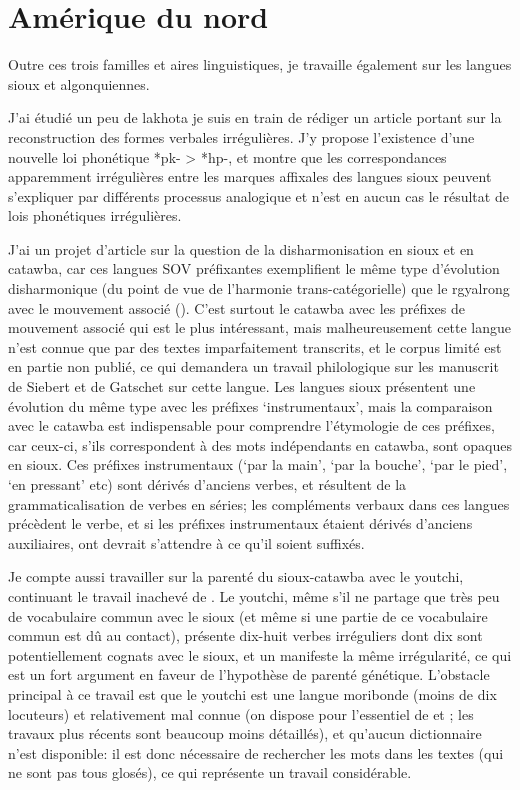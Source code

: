 \documentclass[oldfontcommands,oneside,a4paper,11pt]{memoir}
\begin{document}
\section{Amérique du nord}
Outre ces trois familles et aires linguistiques, je travaille également sur les langues sioux et algonquiennes. 

J'ai étudié un peu de lakhota je suis en train de rédiger un article portant sur la reconstruction des formes verbales irrégulières. J'y propose l'existence d'une nouvelle loi phonétique *pk- > *hp-, et montre que les correspondances apparemment irrégulières entre les marques affixales des langues sioux peuvent s'expliquer par différents processus analogique et n'est en aucun cas le résultat de lois phonétiques irrégulières.  

J'ai un projet d'article sur la question de la disharmonisation en sioux et en catawba, car ces langues SOV préfixantes exemplifient le même type d'évolution disharmonique (du point de vue de l'harmonie trans-catégorielle) que le rgyalrong avec le mouvement associé (\citealt{jacques13harmonization}). C'est surtout le catawba avec les préfixes de mouvement associé qui est le plus intéressant, mais malheureusement cette langue n'est connue que par des textes imparfaitement transcrits, et le corpus limité est en partie non publié, ce qui demandera un travail philologique sur les manuscrit de Siebert et de Gatschet sur cette langue. Les langues sioux présentent une évolution du même type avec les préfixes `instrumentaux', mais la comparaison avec le catawba est indispensable pour comprendre l'étymologie de ces préfixes, car ceux-ci, s'ils correspondent à des mots indépendants en catawba, sont opaques en sioux. Ces préfixes instrumentaux (`par la main', `par la bouche', `par le pied', `en pressant' etc) sont dérivés d'anciens verbes, et résultent de la grammaticalisation de verbes en séries; les compléments verbaux dans ces langues précèdent le verbe, et si les préfixes instrumentaux étaient dérivés d'anciens auxiliaires, ont devrait s'attendre à ce qu'il soient suffixés.

Je compte aussi travailler sur la parenté du sioux-catawba avec le youtchi, continuant le travail inachevé de \citealt{ranking98yuchi}. Le youtchi, même s'il ne partage que très peu de vocabulaire commun avec le sioux (et même si une partie de ce vocabulaire commun est dû au contact), présente dix-huit verbes irréguliers dont dix sont potentiellement cognats avec le sioux, et un manifeste la même irrégularité, ce qui est un fort argument en faveur de l'hypothèse de parenté génétique. L'obstacle principal à ce travail est que le youtchi est une langue moribonde (moins de dix locuteurs) et relativement mal connue (on dispose pour l'essentiel de \citealt{wagner31tales} et  \citealt{wagner38yuchi}; les travaux plus récents sont beaucoup moins détaillés), et qu'aucun dictionnaire n'est disponible: il est donc nécessaire de rechercher les mots dans les textes (qui ne sont pas tous glosés), ce qui représente un travail considérable.
\end{document}
